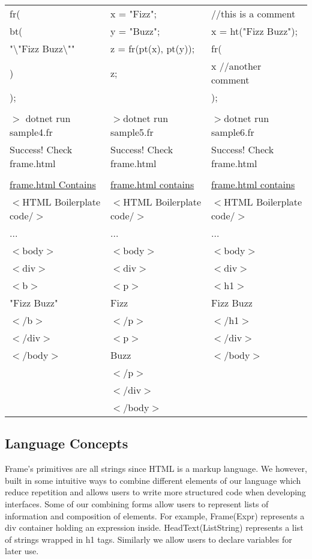 \documentclass{article}
\newcommand\q[1][.7cm]{\hspace*{#1}}
\begin{document}
\begin{center}
\begin{tabular}{l|l|l}
fr( & x = "Fizz"; & //this is a comment\\
\q bt( & y = "Buzz"; & x = ht("Fizz Buzz");\\
\q\q "\textbackslash"Fizz Buzz\textbackslash"" & z = fr(pt(x), pt(y)); & fr(\\
\q ) & z; & \q x //another comment\\
); & & );\\
 & & \\
$>$ dotnet run sample4.fr & $>$dotnet run sample5.fr & $>$dotnet run sample6.fr\\
Success! Check frame.html & Success! Check frame.html & Success! Check frame.html\\
 & & \\
\underline{frame.html Contains} & \underline{frame.html contains} & \underline{frame.html contains}\\
$<$HTML Boilerplate code/$>$ & $<$HTML Boilerplate code/$>$ & $<$HTML Boilerplate code/$>$\\
... & ... & ...\\
$<$body$>$ & $<$body$>$ & $<$body$>$\\
\q$<$div$>$ & \q$<$div$>$ & \q$<$div$>$\\
\q\q$<$b$>$ & \q\q$<$p$>$ & \q\q$<$h1$>$\\
\q\q\q "Fizz Buzz" & \q\q\q Fizz & \q\q\q Fizz Buzz\\
\q\q $<$/b$>$ & \q\q$<$/p$>$ & \q\q$<$/h1$>$\\
\q$<$/div$>$ & \q\q$<$p$>$ & \q$<$/div$>$\\
$<$/body$>$ & \q\q\q Buzz & $<$/body$>$\\
 & \q\q$<$/p$>$ & \\
 & \q$<$/div$>$ & \\
 & $<$/body$>$ & \\
\end{tabular}
\end{center}
\pagebreak
\subsection{Language Concepts}

Frame's primitives are all strings since HTML is a markup language. We however, built in some intuitive ways to combine different elements of our language which reduce repetition and allows users to write more structured code when developing interfaces. Some of our combining forms allow users to represent lists of information and composition of elements. For example, Frame(Expr) represents a div container holding an expression inside. HeadText(ListString) represents a list of strings wrapped in h1 tags. Similarly we allow users to declare variables for later use. 
\end{document}
